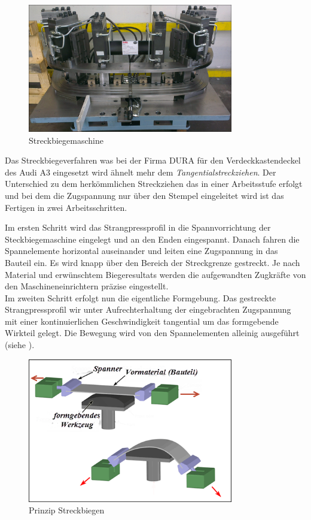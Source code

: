 \documentclass[12pt,a4paper,parskip,twoside,BCOR5mm,headsepline]{scrartcl}
\begin{document}
\begin{figure}[hbtp]
\centering
\includegraphics[width=0.8\textwidth]{steckbiegeeinheit}
\caption{Streckbiegemaschine}
\label{fig:Streckbiegemaschine}
\end{figure}
Das Streckbiegeverfahren was bei der Firma DURA  für den Verdeckkastendeckel des Audi A3 eingesetzt wird ähnelt mehr dem \emph{Tangentialstreckziehen}. Der Unterschied zu dem herkömmlichen Streckziehen das in einer Arbeitsstufe erfolgt und bei dem die Zugspannung nur über den Stempel eingeleitet wird ist das Fertigen in zwei Arbeitsschritten.

 Im ersten Schritt wird das Strangpressprofil in die Spannvorrichtung der Steckbiegemaschine eingelegt und an den Enden eingespannt. Danach fahren die Spannelemente horizontal auseinander und leiten eine Zugspannung in das Bauteil ein. Es wird knapp über den Bereich der Streckgrenze gestreckt. Je nach Material und erwünschtem Biegeresultats werden die aufgewandten Zugkräfte von den Maschineneinrichtern präzise eingestellt.\\
  Im zweiten Schritt erfolgt nun die eigentliche Formgebung. Das gestreckte Strangpressprofil wir unter Aufrechterhaltung der eingebrachten Zugspannung mit einer kontinuierlichen Geschwindigkeit tangential um das formgebende Wirkteil gelegt. Die Bewegung wird von den Spannelementen alleinig ausgeführt (siehe ).
  \begin{figure}[hbtp]
  \centering
  \includegraphics[width=0.8\textwidth]{streckbiegen}
  \caption[Prinzip Streckbiegen]{Prinzip Streckbiegen\protect\footnotemark}
  \label{fig:streckbiegen} 
  \end{figure}
  
\end{document}
